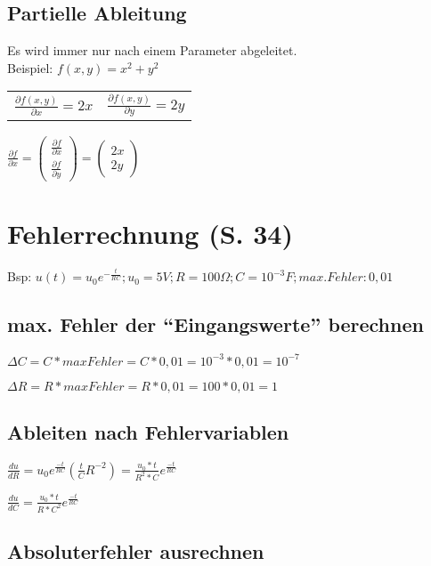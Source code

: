 \documentclass[a4paper, 11pt]{article}
\begin{document}
\subsection{Partielle Ableitung}
Es wird immer nur nach einem Parameter abgeleitet.\\
Beispiel: $f(x,y)= x^2 + y^2$ \\
\newline \begin{tabular}{l r}
	$\frac{\partial f(x,y)}{\partial x}= 2x$ & $\frac{\partial f(x,y)}{\partial 
	y}=2y$\\
\end{tabular}

$\frac{\partial f}{\partial x} = 
\begin{pmatrix}
	\frac{\partial f}{\partial x} \\
	\frac{\partial f}{\partial y}
\end{pmatrix}
= 
\begin{pmatrix}
	2x\\
	2y
\end{pmatrix}$ \newline

\section{Fehlerrechnung (S. 34)}

Bsp: $u(t) = u_0 e^{- \frac{t}{R C}}; u_0 = 5V; R = 100 \Omega; C =
10^{-3}F; max. Fehler: 0,01 $
\subsection { max. Fehler der ``Eingangswerte'' berechnen }

$ \Delta C = C * maxFehler = C * 0,01 = 10^{-3} * 0,01 = 10^{-7} $

$ \Delta R = R * maxFehler = R * 0,01 = 100 * 0,01 = 1 $

\subsection { Ableiten nach Fehlervariablen}

$\frac {du} {dR} = u_0 e^{\frac{-t}{RC}} (\frac{t}{C}R^{-2}) = \frac{u_0 *
t}{R^2 * C} e^{\frac{-t}{RC}}$

$\frac {du} {dC} = \frac{u_0 *
t}{R * C^2} e^{\frac{-t}{RC}}$

\subsection { Absoluterfehler ausrechnen}
\end{document}
